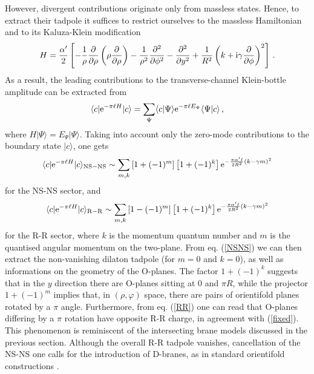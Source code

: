 \documentclass[a4paper,12pt]{article}
\begin{document}
However, divergent contributions originate only from massless 
states. Hence, to extract their tadpole it suffices to restrict ourselves to
the massless Hamiltonian and to its Kaluza-Klein modification
\begin{equation}
H = {\alpha ' \over 2} \left[ -{1\over \rho} {\partial \over \partial \rho}
\left( \rho {\partial \over \partial \rho} \right) - {1\over \rho^2}
{\partial ^2 \over \partial \phi^2} - {\partial^2 \over \partial y^2}
+ {1\over R^2}\left( k + {\rm i} \gamma {\partial \over \partial \phi}
\right)^2 \right]\,.
\end{equation}
As a result, the leading contributions to the transverse-channel Klein-bottle
amplitude can be extracted from
\begin{equation}
\langle c | {\rm e}^{-\pi\ell H} |c\rangle = \sum_{\Psi} \langle c|\Psi 
\rangle {\rm e}^{-\pi \ell E_\Psi} \langle \Psi | c \rangle\,,
\end{equation}
where $H|\Psi \rangle = E_\Psi |\Psi \rangle$. Taking into account only the 
zero-mode contributions to the boundary state $|c\rangle$, one gets\cite{adm}
\begin{equation}
\langle c | {\rm e}^{-\pi\ell H} |c\rangle_{\rm NS-NS} \sim \sum_{m,k}
\left[1+(-1)^m \right] \left[1+(-1)^k\right] {\rm e}^{-{\pi \alpha ' \ell
\over 2 R^2} (k-\gamma m)^2} \label{NSNS}
\end{equation}
for the NS-NS sector, and
\begin{equation}
\langle c | {\rm e}^{-\pi\ell H} |c\rangle_{\rm R-R} \sim \sum_{m,k}
\left[1-(-1)^m \right] \left[1+(-1)^k\right] {\rm e}^{-{\pi \alpha ' \ell
\over 2 R^2} (k-\gamma m)^2} \label{RR}
\end{equation}
for the R-R sector, where $k$ is the momentum quantum number and $m$
is the quantised angular momentum on the two-plane.
From eq. (\ref{NSNS}) we can then extract the 
non-vanishing dilaton tadpole (for $m=0$ and $k=0$), as well as informations
on the geometry of the O-planes. The factor $1+(-1)^k$ suggests that in
the $y$ direction there are O-planes sitting at $0$ and $\pi R$, while
the projector $1+(-1)^m$ implies that, in $(\rho,\varphi)$ space, there are
pairs of orientifold planes rotated by a $\pi$ angle. Furthermore, from eq. 
(\ref{RR}) one can read that O-planes differing by a $\pi$ rotation have
opposite R-R charge, in agreement with (\ref{fixed}). This phenomenon is
reminiscent of the intersecting brane models discussed in the previous section.
Although the overall R-R tadpole vanishes, cancellation of the NS-NS one calls
for the introduction of D-branes, as in standard orientifold constructions
\cite{adm}.
\end{document}
